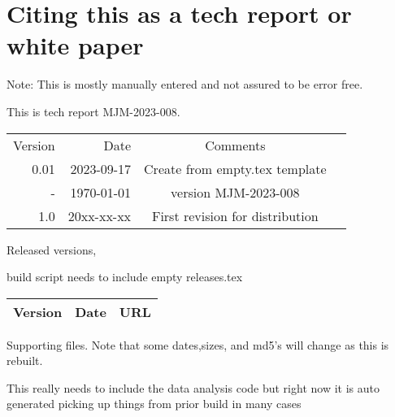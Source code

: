 \documentclass[aps,secnumarabic,balancelastpage,amsmath,amssymb,nofootinbib]{revtex4}
\newcommand{\mjmversion}{\mjmrelease} %
\newcommand{\mjmtrno}{MJM-2023-008}
\newcommand{\mjmversion}{0.00} %
\newcommand{\mjmtrno}{MJM-2023-008}
\newcommand{\mjmmakedate}{2023-09-17 }
\newcommand{\mjmbasename}{\jobname}
\begin{document}
\section{Citing this as a tech report or white paper }
\label{appendix:citing}

Note: This is mostly manually entered and not assured to be error free.

This is tech report \mjmtrno. 

\begin{table}[H] \centering
\begin{tabular}{r|r|c|r}
Version & Date & Comments  &  \\
0.01 & \mjmmakedate  &  Create from empty.tex template  &  \\
-  & \today & version  \mjmversion { }   \mjmtrno  &  \\
1.0 & 20xx-xx-xx & First revision for distribution &  \\
\end{tabular}
\end{table}


Released versions,

build script needs to include empty releases.tex
\begin{table}[H] \centering
\begin{tabular}{|r|r|l|}
Version & Date & URL    \\
\hline

\hline
\end{tabular}
\end{table}





%

\begin{minipage}{\linewidth}
%
%
\mjmshowbib
\end{minipage}





\vspace{1cm}
Supporting files. Note that some dates,sizes, and md5's will change as this is
rebuilt.

This really needs to include the data analysis code 
but right now it is auto generated picking up things from prior
build in many cases 

\end{document}
